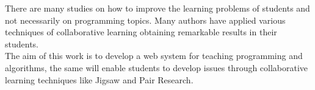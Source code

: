 There are many studies on how to improve the learning problems of students and not necessarily on programming topics. Many authors have applied various techniques of collaborative learning obtaining remarkable results in their students. \\

The aim of this work is to develop a web system for teaching programming and algorithms, the same will enable students to develop issues through collaborative learning techniques like Jigsaw and Pair Research. 